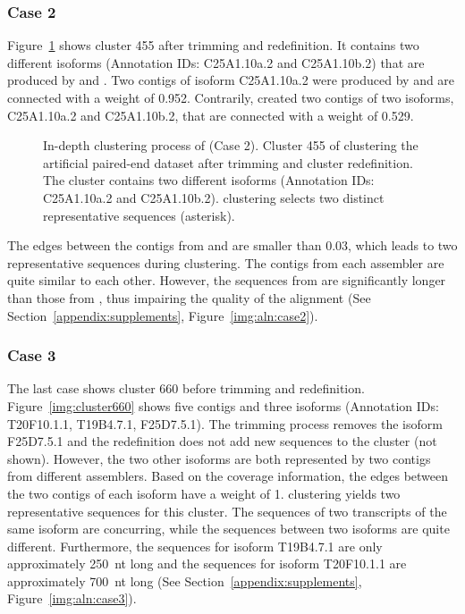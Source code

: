 \documentclass[12pt,a4paper,english]{article}
\begin{document}
	\subsubsection*{Case 2}
	
		Figure~\ref{img:cluster455a} shows cluster 455 after trimming and redefinition. It contains two different isoforms (Annotation IDs: C25A1.10a.2 and C25A1.10b.2) that are produced by \trinity and \soap. 
		Two contigs of isoform C25A1.10a.2 were produced by \soap and are connected with a weight of 0.952. 
		Contrarily, \trinity created two contigs of two isoforms, C25A1.10a.2 and C25A1.10b.2, that are connected with a weight of 0.529.
		\begin{figure}[H]
			\centering
			\def\svgwidth{0.7\textwidth}
			
			\caption[In-depth clustering process of \karma (Case 2).]{In-depth clustering process of \karma (Case 2). Cluster 455 of clustering the artificial paired-end dataset after trimming and cluster redefinition. The cluster contains two different isoforms (Annotation IDs: C25A1.10a.2 and C25A1.10b.2). \mcl clustering selects two distinct representative sequences (asterisk).}
			\label{img:cluster455a}
		\end{figure}
		The edges between the contigs from \soap and \trinity are smaller than 0.03, which leads to two representative sequences during \mcl clustering.
		The contigs from each assembler are quite similar to each other. However, the sequences from \soap are significantly longer than those from \trinity, thus impairing the quality of the alignment (See Section~\ref{appendix:supplements}, Figure~\ref{img:aln:case2}).
		
	\subsubsection*{Case 3}
        The last case shows cluster 660 before trimming and redefinition. Figure~\ref{img:cluster660} shows five contigs and three isoforms (Annotation IDs: T20F10.1.1, T19B4.7.1, F25D7.5.1). The trimming process removes the isoform F25D7.5.1 and the redefinition does not add new sequences to the cluster (not shown).
		However, the two other isoforms are both represented by two contigs from different assemblers. Based on the coverage information, the edges between the two contigs of each isoform have a weight of 1. \mcl clustering yields two representative sequences for this cluster. 
		The sequences of two transcripts of the same isoform are concurring, while the sequences between two isoforms are quite different. Furthermore, the sequences for isoform T19B4.7.1 are only approximately 250~nt long and the sequences for isoform T20F10.1.1 are approximately 700~nt long (See Section~\ref{appendix:supplements}, Figure~\ref{img:aln:case3}).
	
\end{document}
